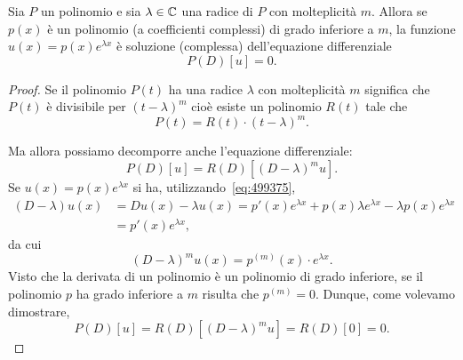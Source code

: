 \begin{theorem}
\mymark{***}
Sia $P$ un polinomio e sia $\lambda\in {\mathbb C}$ una radice di $P$ con molteplicità $m$.
Allora se $p(x)$ è un polinomio (a coefficienti complessi) di grado inferiore a $m$,
la funzione $u(x) = p(x) e^{\lambda x}$ è soluzione (complessa) dell'equazione differenziale
\[
   P(D) [u] = 0.
\]
\end{theorem}
%
\begin{proof}
\mymark{***}
Se il polinomio $P(t)$ ha una radice $\lambda$ con molteplicità $m$ significa che $P(t)$ è divisibile per $(t-\lambda)^m$ cioè esiste un polinomio $R(t)$ tale che
\[
  P(t) = R(t)\cdot (t-\lambda)^m.
\]

Ma allora possiamo decomporre anche l'equazione differenziale:
\[
 P(D) [u] = R(D)[(D - \lambda)^m u].
\]
Se $u(x) = p(x) e^{\lambda x}$ si ha,
utilizzando~\eqref{eq:499375},
\begin{align*}
  (D-\lambda) u(x) &= Du(x) -\lambda u(x) =
  p'(x) e^{\lambda x} + p(x) \lambda e^{\lambda x} - \lambda p(x) e^{\lambda x} \\
  &= p'(x) e^{\lambda x},
\end{align*}
da cui
\[
  (D-\lambda)^m u(x) = p^{(m)}(x) \cdot e^{\lambda x}.
\]
Visto che la derivata di un polinomio è un polinomio di grado inferiore,
se il polinomio $p$ ha grado inferiore a $m$ risulta che $p^{(m)}=0$.
Dunque, come volevamo dimostrare,
\[
 P(D) [u] = R(D) [(D-\lambda)^m u] = R(D) [0] = 0.
\]
\end{proof}

